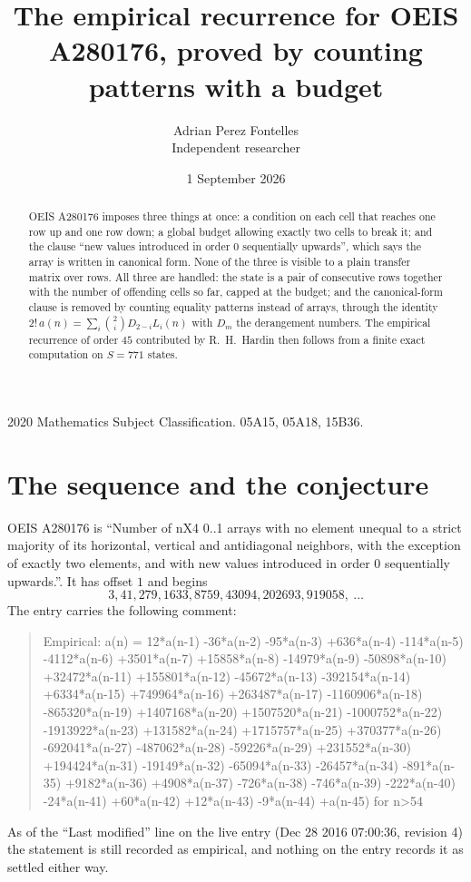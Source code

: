 \documentclass[11pt,a4paper]{article}
\title{The empirical recurrence for OEIS A280176, proved by counting patterns with a budget}
\author{Adrian Perez Fontelles\\ \small Independent researcher}
\date{1 September 2026}
\theoremstyle{plain}
\theoremstyle{definition}
\begin{document}
\maketitle

\begin{abstract}
OEIS A280176 imposes three things at once: a condition on each cell that reaches one row up and
one row down; a global budget allowing exactly two cells to
break it; and the clause ``new values introduced in order $0$ sequentially upwards'', which
says the array is written in canonical form. None of the three is visible to a plain transfer
matrix over rows. All three are handled: the state is a pair of consecutive rows
together with the number of offending cells so far, capped at the budget; and the
canonical-form clause is removed by counting equality patterns instead of arrays, through the
identity $2!\,a(n)=\sum_i\binom{2}{i}D_{2-i}L_i(n)$ with $D_m$ the derangement
numbers. The empirical recurrence of order $45$ contributed by R.~H.~Hardin then follows
from a finite exact computation on $S=771$ states.
\end{abstract}

\noindent\small 2020 Mathematics Subject Classification. 05A15, 05A18, 15B36.\normalsize

\section{The sequence and the conjecture}

OEIS A280176 is ``Number of nX4 0..1 arrays with no element unequal to a strict majority of its horizontal, vertical and antidiagonal neighbors, with the exception of exactly two elements, and with new values introduced in order 0 sequentially upwards.''. It has offset $1$ and begins
\[
3, 41, 279, 1633, 8759, 43094, 202693, 919058,\ \dots
\]
The entry carries the following comment:
\begin{quote}\small
Empirical: a(n) = 12*a(n-1) -36*a(n-2) -95*a(n-3) +636*a(n-4) -114*a(n-5) -4112*a(n-6) +3501*a(n-7) +15858*a(n-8) -14979*a(n-9) -50898*a(n-10) +32472*a(n-11) +155801*a(n-12) -45672*a(n-13) -392154*a(n-14) +6334*a(n-15) +749964*a(n-16) +263487*a(n-17) -1160906*a(n-18) -865320*a(n-19) +1407168*a(n-20) +1507520*a(n-21) -1000752*a(n-22) -1913922*a(n-23) +131582*a(n-24) +1715757*a(n-25) +370377*a(n-26) -692041*a(n-27) -487062*a(n-28) -59226*a(n-29) +231552*a(n-30) +194424*a(n-31) -19149*a(n-32) -65094*a(n-33) -26457*a(n-34) -891*a(n-35) +9182*a(n-36) +4908*a(n-37) -726*a(n-38) -746*a(n-39) -222*a(n-40) -24*a(n-41) +60*a(n-42) +12*a(n-43) -9*a(n-44) +a(n-45) for n>54
\end{quote}
As of the ``Last modified'' line on the live entry (Dec 28 2016 07:00:36, revision 4) the statement is
still recorded as empirical, and nothing on the entry records it as settled either way.
\end{document}
